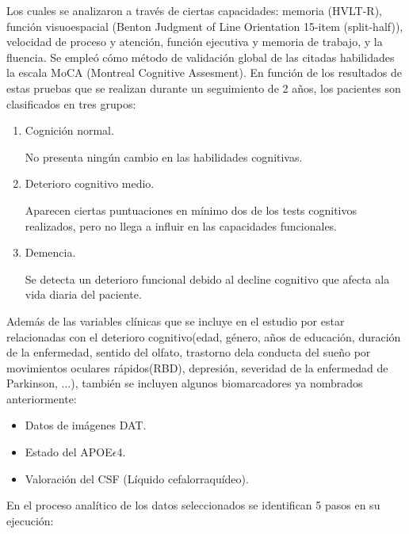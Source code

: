 Los cuales se analizaron a través de ciertas capacidades: memoria (HVLT-R), función visuoespacial (Benton Judgment of Line Orientation 15-item (split-half)), velocidad de proceso y atención, función ejecutiva y memoria de trabajo, y la fluencia. Se empleó cómo método de validación global de las citadas habilidades la escala MoCA (Montreal Cognitive Assesment). En función de los resultados de estas pruebas que se realizan durante un seguimiento de 2 años, los pacientes son clasificados en tres grupos:
\begin{enumerate}
	\item Cognición normal.
	
	No presenta ningún cambio en las habilidades cognitivas.
	
	\item Deterioro cognitivo medio.
	
	Aparecen ciertas puntuaciones en mínimo dos de los tests cognitivos  realizados, pero no llega a influir en las capacidades funcionales.
	
	\item Demencia.	
	
	Se detecta un deterioro funcional debido al decline cognitivo que afecta ala vida diaria del paciente.
\end{enumerate}

Además de las variables clínicas que se incluye en el estudio por estar relacionadas con el deterioro cognitivo(edad, género, años de educación, duración de la enfermedad, sentido del olfato, trastorno dela conducta del sueño por movimientos oculares rápidos(RBD), depresión, severidad de la enfermedad de Parkinson, ...), también se incluyen algunos biomarcadores ya nombrados anteriormente: 
\begin{itemize}
	\item Datos de imágenes DAT.
	\item Estado del APOE$\epsilon$4.
	\item Valoración del CSF (Líquido cefalorraquídeo).
\end{itemize}

En el proceso analítico de los datos seleccionados se identifican 5 pasos en su ejecución:

